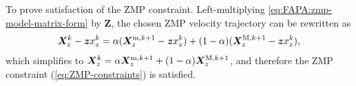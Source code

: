 To prove satisfaction of the ZMP constraint. Left-multiplying
\eqref{eq:FAPA:zmp-model-matrix-form} by $\bm{Z}$, the chosen ZMP velocity
trajectory can be rewritten as
\begin{equation*}
\bm{X}_z^k - \bm{z} x_z^k = \alpha (\bm{X}_z^{{\rm m}, k+1} - \bm{z} x_z^k) + (1-\alpha)(\bm{X}_z^{{\rm M}, k+1} - \bm{z} x_z^k),
\end{equation*}
which simplifies to
$\bm{X}_z^k = \alpha \bm{X}_z^{{\rm m}, k+1} + (1-\alpha)\bm{X}_z^{{\rm M}, k+1}$,
and therefore the ZMP constraint (\ref{eq:ZMP-constraints}) is satisfied.
\hfill\bull
